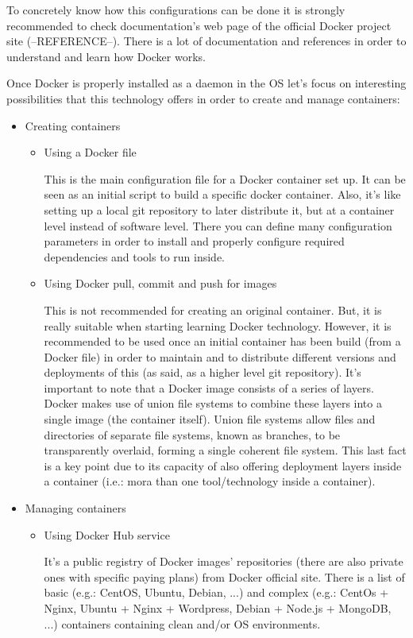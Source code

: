 To concretely know how this configurations can be done it is strongly recommended to check documentation's web page of the official Docker project site (--REFERENCE--). There is a lot of documentation and references in order to understand and learn how Docker works.

Once Docker is properly installed as a daemon in the OS let's focus on interesting possibilities that this technology offers in order to create and manage containers:

\begin{itemize}
\item Creating containers
	\begin{itemize}
	\item Using a Docker file \hfill
	
	This is the main configuration file for a Docker container set up. It can be seen as an initial script to build a specific docker container. Also, it's like setting up a local git repository to later distribute it, but at a container level instead of software level. There you can define many configuration parameters in order to install and properly configure required dependencies and tools to run inside. 	
	
	\item Using Docker pull, commit and push for images

	This is not recommended for creating an original container. But, it is really suitable when starting learning Docker technology. However, it is recommended to be used once an initial container has been build (from a Docker file) in order to maintain and to distribute different versions and deployments of this (as said, as a higher level git repository).	 
It's important to note that a Docker image consists of a series of layers. Docker makes use of union file systems to combine these layers into a single image (the container itself). Union file systems allow files and directories of separate file systems, known as branches, to be transparently overlaid, forming a single coherent file system. This last fact is a key point due to its capacity of also offering deployment layers inside a container (i.e.: mora than one tool/technology inside a container).
	
	\end{itemize}
\item Managing containers 
	\begin{itemize}
	\item Using Docker Hub service

	It's a public registry of Docker images' repositories (there are also private ones with specific paying plans) from Docker official site. There is a list of basic (e.g.: CentOS, Ubuntu, Debian, ...) and complex (e.g.: CentOs + Nginx, Ubuntu + Nginx + Wordpress, Debian + Node.js + MongoDB, ...) containers containing clean and/or OS environments. 
	

\end{itemize}
\end{itemize}
